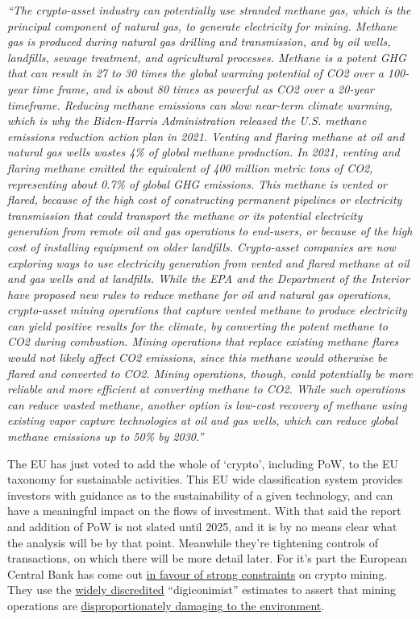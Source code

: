 \textit{``The crypto-asset industry can potentially use stranded methane gas, which is the principal component of natural gas, to generate electricity for mining. Methane gas is produced during natural gas drilling and transmission, and by oil wells, landfills, sewage treatment, and agricultural processes. Methane is a potent GHG that can result in 27 to 30 times the global warming potential of CO2 over a 100-year time frame, and is about 80 times as powerful as CO2 over a 20-year timeframe. Reducing methane emissions can slow near-term climate warming, which is why the Biden-Harris Administration released the U.S. methane emissions reduction action plan in 2021. Venting and flaring methane at oil and natural gas wells wastes 4\% of global methane production. In 2021, venting and flaring methane emitted the equivalent of 400 million metric tons of CO2, representing about 0.7\% of global GHG emissions. This methane is vented or flared, because of the high cost of constructing permanent pipelines or electricity transmission that could transport the methane or its potential electricity generation from remote oil and gas operations to end-users, or because of the high cost of installing equipment on older landfills. Crypto-asset companies are now exploring ways to use electricity generation from vented and flared methane at oil and gas wells and at landfills.
While the EPA and the Department of the Interior have proposed new rules to reduce methane for oil and natural gas operations, crypto-asset mining operations that capture vented methane to produce electricity can yield positive results for the climate, by converting the potent methane to CO2 during combustion. Mining operations that replace existing methane flares would not likely affect CO2 emissions, since this methane would otherwise be flared and converted to CO2. Mining operations, though, could potentially be more reliable and more efficient at converting methane to CO2. While such operations can reduce wasted methane, another option is low-cost recovery of methane using existing vapor capture technologies at oil and gas wells, which can reduce global methane emissions up to 50\% by 2030.''}\par
The EU has just voted to add the whole of `crypto', including PoW, to the EU taxonomy for sustainable activities. This EU wide classification system provides investors with guidance as to the sustainability of a given technology, and can have a meaningful impact on the flows of investment. With that said the report and addition of PoW is not slated until 2025, and it is by no means clear what the analysis will be by that point. Meanwhile they're tightening controls of transactions, on which there will be more detail later. For it's part the European Central Bank has come out \href{}{in favour of strong constraints} on crypto mining. They use the \href{https://medium.com/crescofin/the-reports-of-bitcoin-environmental-damage-are-garbage-5a93d32c2d7}{widely discredited} ``digiconimist'' estimates to assert that mining operations are \href{https://www.ecb.europa.eu/pub/financial-stability/macroprudential-bulletin/html/ecb.mpbu202207_3~d9614ea8e6.en.html}{disproportionately damaging to the environment}.  \par

